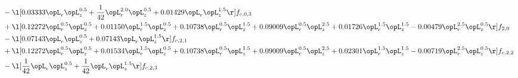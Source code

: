 \begin{alignat}{2}
& - \l[  0.03333 \opL_r \opL_z^{0.5} + \frac{1}{42} \opL_r^{2.0} \opL_z^{0.5} +  0.01429 \opL_r \opL_z^{1.5}  \r] f_{c,0,3} \nonumber \\ 
& + \l[  0.12272 \opL_r^{0.5} \opL_z^{0.5} +  0.01150 \opL_r^{1.5} \opL_z^{0.5} +  0.10738 \opL_r^{0.5} \opL_z^{1.5} +  0.09009 \opL_r^{0.5} \opL_z^{2.5} +  0.01726 \opL_r^{1.5} \opL_z^{1.5}   -0.00479 \opL_r^{2.5} \opL_z^{0.5}  \r] f_{2,0} \nonumber \\ 
& - \l[  0.07143 \opL_r \opL_z^{0.5} +  0.07143 \opL_r \opL_z^{1.5}  \r] f_{c,2,1} \nonumber \\ 
& + \l[  0.12272 \opL_r^{0.5} \opL_z^{0.5} +  0.01534 \opL_r^{1.5} \opL_z^{0.5} +  0.10738 \opL_r^{0.5} \opL_z^{1.5} +  0.09009 \opL_r^{0.5} \opL_z^{2.5} +  0.02301 \opL_r^{1.5} \opL_z^{1.5}   -0.00719 \opL_r^{2.5} \opL_z^{0.5}  \r] f_{c,2,2} \nonumber \\ 
& - \l[ \frac{1}{42} \opL_r \opL_z^{0.5} + \frac{1}{42} \opL_r \opL_z^{1.5}  \r] f_{c,2,3} \nonumber \\ 
\end{alignat} 


